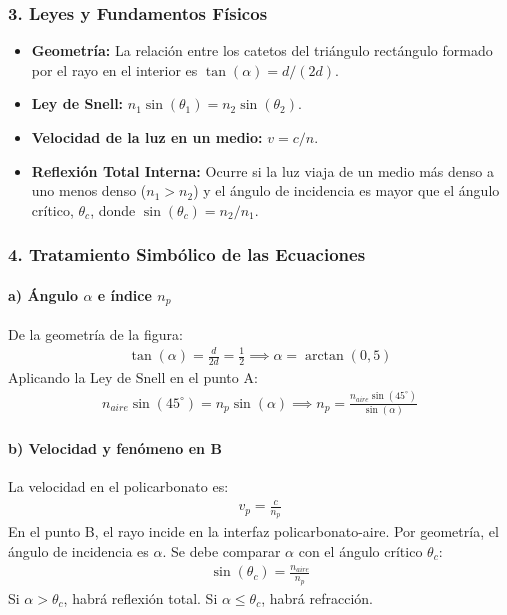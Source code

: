 \subsubsection*{3. Leyes y Fundamentos Físicos}
\begin{itemize}
    \item \textbf{Geometría:} La relación entre los catetos del triángulo rectángulo formado por el rayo en el interior es $\tan(\alpha) = d/(2d)$.
    \item \textbf{Ley de Snell:} $n_1 \sin(\theta_1) = n_2 \sin(\theta_2)$.
    \item \textbf{Velocidad de la luz en un medio:} $v = c/n$.
    \item \textbf{Reflexión Total Interna:} Ocurre si la luz viaja de un medio más denso a uno menos denso ($n_1>n_2$) y el ángulo de incidencia es mayor que el ángulo crítico, $\theta_c$, donde $\sin(\theta_c)=n_2/n_1$.
\end{itemize}
\subsubsection*{4. Tratamiento Simbólico de las Ecuaciones}
\paragraph{a) Ángulo $\alpha$ e índice $n_p$}
De la geometría de la figura:
\begin{gather}
    \tan(\alpha) = \frac{d}{2d} = \frac{1}{2} \implies \alpha = \arctan(0,5)
\end{gather}
Aplicando la Ley de Snell en el punto A:
\begin{gather}
    n_{aire} \sin(45^\circ) = n_p \sin(\alpha) \implies n_p = \frac{n_{aire} \sin(45^\circ)}{\sin(\alpha)}
\end{gather}
\paragraph{b) Velocidad y fenómeno en B}
La velocidad en el policarbonato es:
\begin{gather}
    v_p = \frac{c}{n_p}
\end{gather}
En el punto B, el rayo incide en la interfaz policarbonato-aire. Por geometría, el ángulo de incidencia es $\alpha$. Se debe comparar $\alpha$ con el ángulo crítico $\theta_c$:
\begin{gather}
    \sin(\theta_c) = \frac{n_{aire}}{n_p}
\end{gather}
Si $\alpha > \theta_c$, habrá reflexión total. Si $\alpha \le \theta_c$, habrá refracción.
